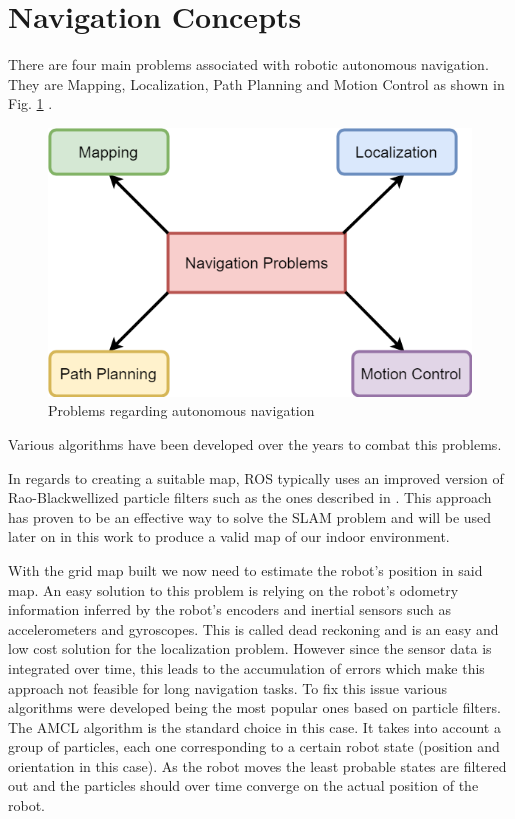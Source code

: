 \section {Navigation Concepts}
There are four main problems associated with robotic autonomous navigation. They are Mapping, Localization, Path Planning and Motion Control \cite{nav} as shown in Fig. \ref{fig:probNav} . 

\begin{figure}[ht!] 
\centerline{\includegraphics [width=0.8 \textwidth]{imgs/chapter3/navprobs.png}}
\caption{Problems regarding autonomous navigation}
\label{fig:probNav}
\end{figure}
Various algorithms have been developed over the years to combat this problems. 

In regards to creating a suitable map,  \ac{ROS}  typically uses an improved version of  Rao-Blackwellized particle filters such as the ones described in \cite{grisetti2007improved}. This approach has proven to be an effective way to solve the \ac{SLAM} problem and will be used later on in this work to produce a valid map of our indoor environment.

With the grid map built we now need to estimate the robot's position in said map. 
An easy solution to this problem is relying on the robot's odometry information inferred by the robot's encoders and inertial sensors such as accelerometers and gyroscopes. This is called dead reckoning and is an easy and low cost solution for the localization problem. However since the sensor data is integrated over time, this leads to the accumulation of errors which make this approach not feasible for long navigation tasks. 
To fix this issue various algorithms were developed being the most popular ones based on particle filters. The \ac{AMCL} \cite{amclpaper} algorithm  is the standard choice in this case. It takes into account a group of particles, each one corresponding to a certain robot state (position and orientation in this case). As the robot moves the least probable states are filtered out and  the particles should over time converge on the actual position of the robot.  


